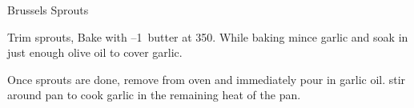 
\begin{recipe}{Brussels Sprouts}%
  \maketitle

  Trim sprouts, Bake with \half--1~\T butter at 350\degF. While baking
  mince garlic and soak in just enough olive oil to cover garlic.

  Once sprouts are done, remove from oven and immediately pour in garlic
  oil. stir around pan to cook garlic in the remaining heat of the pan.
\end{recipe}

